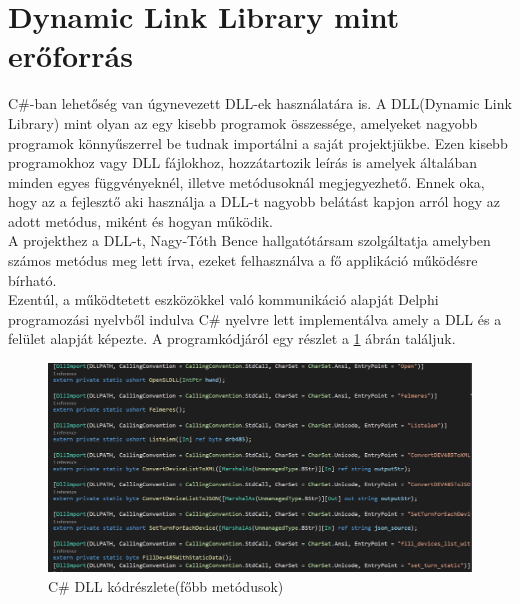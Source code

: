 \documentclass[tocnopagenum]{thesis-ekf}
\theoremstyle{definition}
\theoremstyle{remark}
\begin{document}
	\section{Dynamic Link Library mint erőforrás}
	C\#-ban lehetőség van úgynevezett DLL-ek használatára is. A DLL(Dynamic Link Library) mint olyan az egy kisebb programok összessége, amelyeket nagyobb programok könnyűszerrel be tudnak importálni a saját projektjükbe. Ezen kisebb programokhoz vagy DLL fájlokhoz, hozzátartozik leírás is amelyek általában minden egyes függvényeknél, illetve metódusoknál megjegyezhető. Ennek oka, hogy az a fejlesztő aki használja a DLL-t
	nagyobb belátást kapjon arról hogy az adott metódus, miként és hogyan működik.\cite{benlutkevich}
	\\
	A projekthez a DLL-t, Nagy-Tóth Bence hallgatótársam szolgáltatja amelyben számos metódus meg lett írva, ezeket felhasználva a fő applikáció működésre bírható.
	\\
	Ezentúl, a működtetett eszközökkel való kommunikáció alapját Delphi programozási nyelvből indulva C\# nyelvre lett implementálva amely a DLL és a felület alapját képezte. A programkódjáról egy részlet a \ref{fig:dllbence} ábrán találjuk. 
	\begin{figure}[H]	
		\centering
		\includegraphics[scale=0.3]{DLL_bence}
		\caption[C\# DLL kódrészlete]{C\# DLL kódrészlete(főbb metódusok)}
		\label{fig:dllbence}
	\end{figure}
\end{document}
